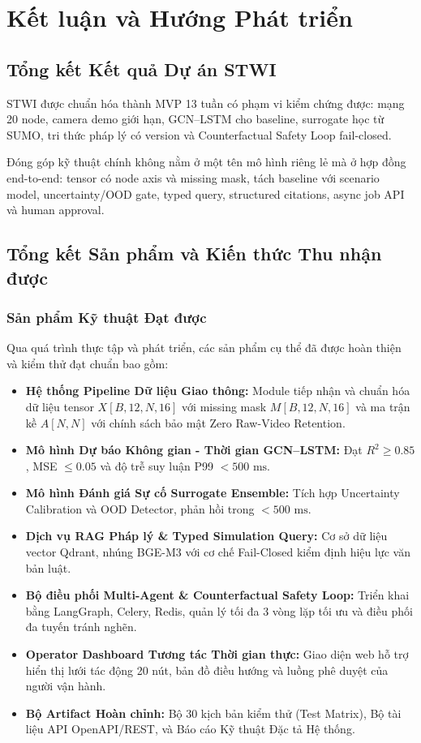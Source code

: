 \chapter{Kết luận và Hướng Phát triển}

\section{Tổng kết Kết quả Dự án STWI}

STWI được chuẩn hóa thành MVP 13 tuần có phạm vi kiểm chứng được: mạng 20 node, camera demo giới hạn, GCN--LSTM cho baseline, surrogate học từ SUMO, tri thức pháp lý có version và Counterfactual Safety Loop fail-closed.

Đóng góp kỹ thuật chính không nằm ở một tên mô hình riêng lẻ mà ở hợp đồng end-to-end: tensor có node axis và missing mask, tách baseline với scenario model, uncertainty/OOD gate, typed query, structured citations, async job API và human approval.

\section{Tổng kết Sản phẩm và Kiến thức Thu nhận được}

\subsection{Sản phẩm Kỹ thuật Đạt được}
Qua quá trình thực tập và phát triển, các sản phẩm cụ thể đã được hoàn thiện và kiểm thử đạt chuẩn bao gồm:
\begin{itemize}[leftmargin=1.5cm, label=$\bullet$]
  \item \textbf{Hệ thống Pipeline Dữ liệu Giao thông:} Module tiếp nhận và chuẩn hóa dữ liệu tensor $X[B,12,N,16]$ với missing mask $M[B,12,N,16]$ và ma trận kề $A[N,N]$ với chính sách bảo mật Zero Raw-Video Retention.
  \item \textbf{Mô hình Dự báo Không gian - Thời gian GCN--LSTM:} Đạt $R^2 \ge 0.85$, MSE $\le 0.05$ và độ trễ suy luận P99 $< 500\text{ ms}$.
  \item \textbf{Mô hình Đánh giá Sự cố Surrogate Ensemble:} Tích hợp Uncertainty Calibration và OOD Detector, phản hồi trong $< 500\text{ ms}$.
  \item \textbf{Dịch vụ RAG Pháp lý \& Typed Simulation Query:} Cơ sở dữ liệu vector Qdrant, nhúng BGE-M3 với cơ chế Fail-Closed kiểm định hiệu lực văn bản luật.
  \item \textbf{Bộ điều phối Multi-Agent \& Counterfactual Safety Loop:} Triển khai bằng LangGraph, Celery, Redis, quản lý tối đa 3 vòng lặp tối ưu và điều phối đa tuyến tránh nghẽn.
  \item \textbf{Operator Dashboard Tương tác Thời gian thực:} Giao diện web hỗ trợ hiển thị lưới tác động 20 nút, bản đồ điều hướng và luồng phê duyệt của người vận hành.
  \item \textbf{Bộ Artifact Hoàn chỉnh:} Bộ 30 kịch bản kiểm thử (Test Matrix), Bộ tài liệu API OpenAPI/REST, và Báo cáo Kỹ thuật Đặc tả Hệ thống.
\end{itemize}

